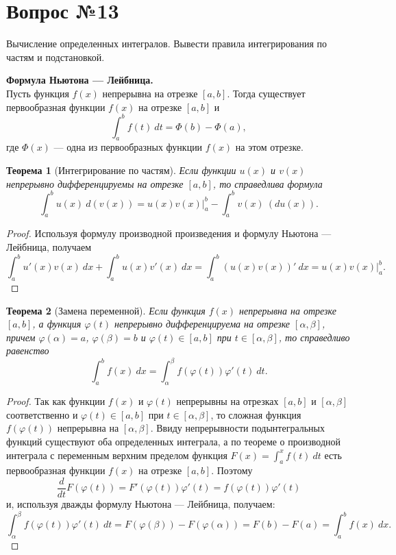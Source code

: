 \documentclass[12pt]{report}
\numberwithin{equation}{section}
\newtheorem{theorem}{Теорема}[section]
\begin{document}
\newpage \section{Вопрос №13} %
\begin{framed}
Вычисление определенных интегралов. Вывести правила интегрирования по частям и подстановкой.
\end{framed}

\textbf{Формула Ньютона --- Лейбница.}\\

Пусть функция $f(x)$ непрерывна на отрезке $[a,b]$. Тогда существует первообразная функции $f(x)$ на отрезке $[a,b]$ и
\[ \int_a^b f(t)~dt = \Phi(b) - \Phi(a), \]
где $\Phi(x)$ --- одна из первообразных функции $f(x)$ на этом отрезке.

\begin{theorem}[Интегрирование по частям] \label{th:13:1}
Если функции $u(x)$ и $v(x)$ непрерывно дифференцируемы на отрезке $[a,b]$, то справедлива формула
\[ \int_a^b u(x) ~d(v(x)) = u(x) v(x) \biggr\vert_a^b - \int_a^b v(x)~(du(x)).\]
\end{theorem}
\begin{proof}
Используя формулу производной произведения и формулу Ньютона --- Лейбница, получаем
\[ \int_a^b u'(x) v(x) ~dx + \int_a^b u(x) v'(x) ~dx = \int_a^b(u(x)v(x))' ~dx = u(x)  v(x) \biggr\vert_a^b.\]
\end{proof}

\begin{theorem} [Замена переменной]\label{th:13:2}
Если функция $f(x)$ непрерывна на отрезке $[a,b]$, а функция $\varphi(t)$ непрерывно дифференцируема на отрезке $[\alpha, \beta]$, причем $\varphi(\alpha) = a$, $\varphi(\beta) = b$ и $\varphi(t) \in [a,b]$ при $t \in [\alpha, \beta]$, то справедливо равенство
\[ \int_a^b f(x)~dx = \int_{\alpha}^{\beta} f(\varphi(t)) \varphi'(t)~dt.\]
\end{theorem}
\begin{proof}
Так как функции $f(x)$ и $\varphi(t)$ непрерывны на отрезках $[a,b]$ и $[\alpha, \beta]$ соответственно и $\varphi(t) \in [a,b]$ при $t \in [\alpha, \beta]$, то сложная функция $f(\varphi(t))$ непрерывна на $[\alpha, \beta]$. Ввиду непрерывности подынтегральных функций существуют оба  определенных интеграла, а по теореме о производной интеграла с переменным верхним пределом функция $F(x) = \int_a^x f(t)~dt$ есть первообразная функции $f(x)$ на отрезке $[a,b]$. Поэтому
\[ \frac{d}{dt}F(\varphi(t)) = F'(\varphi(t)) \varphi'(t) = f(\varphi(t))\varphi'(t)\]
и, используя дважды формулу Ньютона --- Лейбница, получаем:
\[ \int_{\alpha}^{\beta} f(\varphi(t))\varphi'(t)~dt = F(\varphi(\beta)) -F(\varphi(\alpha)) = F(b) - F(a) = \int_a^b f(x)~dx. \]
\end{proof}
\end{document}
